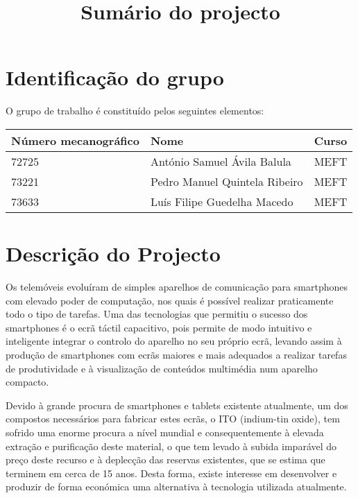 \documentclass[%
	nofootinbib,
	amsmath,amssymb,
	aps,
	12pt,
	a4paper
]{article}
\begin{document}


\title{Sumário do projecto}
\date{}
\maketitle


\section{Identificação do grupo}
O grupo de trabalho é constituído pelos seguintes elementos:

\begin{center}
	\begin{tabular}{lll}
		Número mecanográfico	&Nome			&Curso	\\ \hline
		72725					&António Samuel Ávila Balula	&MEFT	\\
		73221					&Pedro Manuel Quintela Ribeiro	&MEFT	\\
		73633					&Luís Filipe Guedelha Macedo 	&MEFT	\\
	\end{tabular}
\end{center}

\section{Descrição do Projecto}
Os telemóveis evoluíram de simples aparelhos de comunicação para smartphones com elevado poder de computação, nos quais é possível realizar praticamente todo o tipo de tarefas. Uma das tecnologias que permitiu o sucesso dos smartphones é o ecrã táctil capacitivo, pois permite de modo intuitivo e inteligente integrar o controlo do aparelho no seu próprio ecrã, levando assim à produção de smartphones com ecrãs maiores e mais adequados a realizar tarefas de produtividade e à visualização de conteúdos multimédia num aparelho compacto.

Devido à grande procura de smartphones e tablets existente atualmente, um dos compostos necessários para fabricar estes ecrãs, o ITO (indium-tin oxide), tem sofrido uma enorme procura a nível mundial e consequentemente à elevada extração e purificação deste material, o que tem levado à subida imparável do preço deste recurso e à deplecção das reservas existentes, que se estima que terminem em cerca de 15 anos. Desta forma, existe interesse em desenvolver e produzir de forma económica uma alternativa à tecnologia utilizada atualmente.
\end{document}
